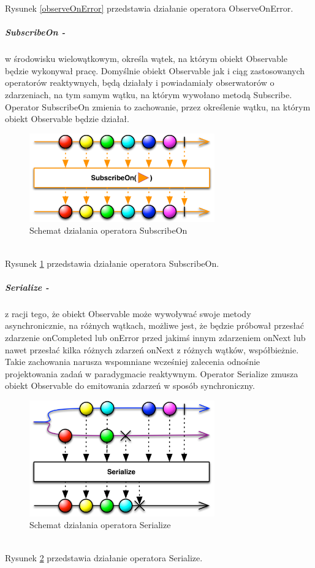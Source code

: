 \documentclass[12pt,oneside,a4paper]{report}
\begin{document}
Rysunek \ref{observeOnError} przedstawia działanie operatora ObserveOnError.
\subparagraph{SubscribeOn -}w środowisku wielowątkowym, określa wątek, na którym obiekt Observable będzie wykonywał pracę. Domyślnie obiekt Observable jak i ciąg zastosowanych operatorów reaktywnych, będą działały i powiadamiały obserwatorów o zdarzeniach, na tym samym wątku, na którym wywołano metodą Subscribe. Operator SubscribeOn zmienia to zachowanie, przez określenie wątku, na którym obiekt Observable będzie działał. 
\begin{figure}[ht!]
	\centering
	\includegraphics[width=8cm]{subscribeOn}
	\caption{Schemat działania operatora SubscribeOn\cite{operators}}
	\label{subscribeOn}
\end{figure}\\
Rysunek \ref{subscribeOn} przedstawia działanie operatora SubscribeOn.
\subparagraph{Serialize -}z racji tego, że obiekt Observable może wywoływać swoje metody asynchronicznie, na różnych wątkach, możliwe jest, że będzie próbował przesłać zdarzenie onCompleted lub onError przed jakimś innym zdarzeniem onNext lub nawet przesłać kilka różnych zdarzeń onNext z różnych wątków, współbieżnie. Takie zachowania narusza wspomniane wcześniej zalecenia odnośnie projektowania zadań w paradygmacie reaktywnym. Operator Serialize zmusza obiekt Observable do emitowania zdarzeń w sposób synchroniczny.
\begin{figure}[ht!]
	\centering
	\includegraphics[width=8cm]{serialize}
	\caption{Schemat działania operatora Serialize\cite{operators}}
	\label{serialize}
\end{figure}\\
Rysunek \ref{serialize} przedstawia działanie operatora Serialize.
\end{document}
